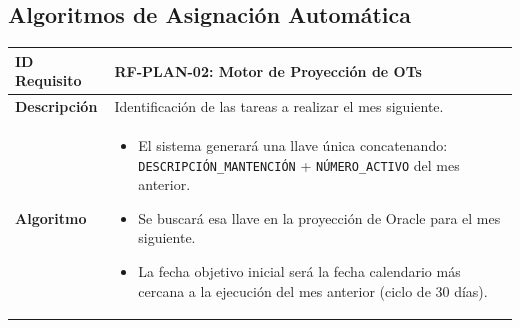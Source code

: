 \documentclass[11pt, letterpaper]{article}
\begin{document}
\subsection{Algoritmos de Asignación Automática}
\begin{longtable}{|p{3.5cm}|p{11.5cm}|}
\hline
\rowcolor{headergray} \textbf{ID Requisito} & \textbf{RF-PLAN-02: Motor de Proyección de OTs} \\ \hline
\textbf{Descripción} & Identificación de las tareas a realizar el mes siguiente. \\ \hline
\textbf{Algoritmo} & 
\begin{itemize}
    \item El sistema generará una llave única concatenando: \texttt{DESCRIPCIÓN\_MANTENCIÓN} + \texttt{NÚMERO\_ACTIVO} del mes anterior.
    \item Se buscará esa llave en la proyección de Oracle para el mes siguiente.
    \item La fecha objetivo inicial será la fecha calendario más cercana a la ejecución del mes anterior (ciclo de 30 días).
\end{itemize} \\ \hline
\end{longtable}
\end{document}
